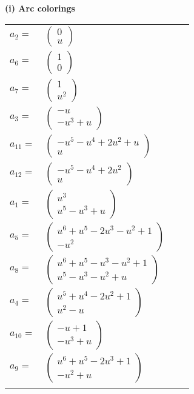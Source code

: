 \documentclass[1p]{elsarticle_modified}
\theoremstyle{definition}
\begin{document}
\flushleft \textbf{(i) Arc colorings}\\
\begin{tabular}{m{7pt} m{180pt} m{7pt} m{180pt} }
\flushright $a_{2}=$&$\begin{pmatrix}0\\u\end{pmatrix}$ \\
\flushright $a_{6}=$&$\begin{pmatrix}1\\0\end{pmatrix}$ \\
\flushright $a_{7}=$&$\begin{pmatrix}1\\u^2\end{pmatrix}$ \\
\flushright $a_{3}=$&$\begin{pmatrix}- u\\- u^3+u\end{pmatrix}$ \\
\flushright $a_{11}=$&$\begin{pmatrix}- u^5- u^4+2 u^2+u\\u\end{pmatrix}$ \\
\flushright $a_{12}=$&$\begin{pmatrix}- u^5- u^4+2 u^2\\u\end{pmatrix}$ \\
\flushright $a_{1}=$&$\begin{pmatrix}u^3\\u^5- u^3+u\end{pmatrix}$ \\
\flushright $a_{5}=$&$\begin{pmatrix}u^6+u^5-2 u^3- u^2+1\\- u^2\end{pmatrix}$ \\
\flushright $a_{8}=$&$\begin{pmatrix}u^6+u^5- u^3- u^2+1\\u^5- u^3- u^2+u\end{pmatrix}$ \\
\flushright $a_{4}=$&$\begin{pmatrix}u^5+u^4-2 u^2+1\\u^2- u\end{pmatrix}$ \\
\flushright $a_{10}=$&$\begin{pmatrix}- u+1\\- u^3+u\end{pmatrix}$ \\
\flushright $a_{9}=$&$\begin{pmatrix}u^6+u^5-2 u^3+1\\- u^2+u\end{pmatrix}$\\&\end{tabular}
\end{document}

